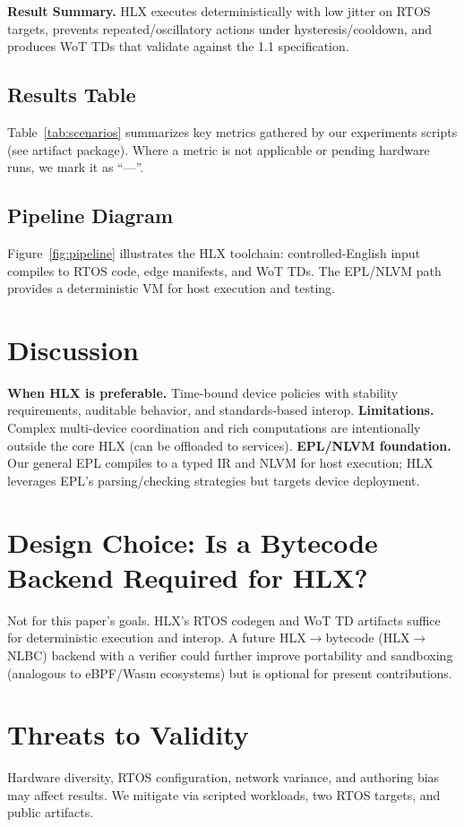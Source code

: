 \documentclass[journal]{IEEEtran}
\begin{document}
\noindent\textbf{Result Summary.} HLX executes deterministically with low jitter on RTOS targets, prevents repeated/oscillatory actions under hysteresis/cooldown, and produces WoT TDs that validate against the 1.1 specification.

\subsection{Results Table}
Table~\ref{tab:scenarios} summarizes key metrics gathered by our experiments scripts (see artifact package). Where a metric is not applicable or pending hardware runs, we mark it as ``—''.



\subsection{Pipeline Diagram}
Figure~\ref{fig:pipeline} illustrates the HLX toolchain: controlled-English input compiles to RTOS code, edge manifests, and WoT TDs. The EPL/NLVM path provides a deterministic VM for host execution and testing.



\section{Discussion}
\textbf{When HLX is preferable.} Time-bound device policies with stability requirements, auditable behavior, and standards-based interop. \textbf{Limitations.} Complex multi-device coordination and rich computations are intentionally outside the core HLX (can be offloaded to services). \textbf{EPL/NLVM foundation.} Our general EPL compiles to a typed IR and NLVM for host execution; HLX leverages EPL’s parsing/checking strategies but targets device deployment.

\section{Design Choice: Is a Bytecode Backend Required for HLX?}
Not for this paper’s goals. HLX’s RTOS codegen and WoT TD artifacts suffice for deterministic execution and interop. A future HLX$\rightarrow$bytecode (HLX$\rightarrow$NLBC) backend with a verifier could further improve portability and sandboxing (analogous to eBPF/Wasm ecosystems) but is optional for present contributions.

\section{Threats to Validity}
Hardware diversity, RTOS configuration, network variance, and authoring bias may affect results. We mitigate via scripted workloads, two RTOS targets, and public artifacts.
\end{document}
